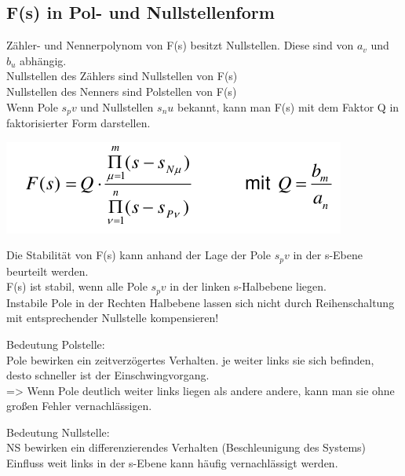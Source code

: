 \documentclass[10pt,a4paper]{article}
\begin{document}
\subsection{F(s) in Pol- und Nullstellenform}
\begin{mdframed}[style=exercise]
        Zähler- und Nennerpolynom von F(s) besitzt Nullstellen. Diese sind von $a_v$ und $b_u$ abhängig.\\
        Nullstellen des Zählers sind Nullstellen von F(s)\\
        Nullstellen des Nenners sind Polstellen von F(s)\\
        Wenn Pole $s_pv$ und Nullstellen $s_nu$ bekannt, kann man F(s) mit dem Faktor Q in faktorisierter Form darstellen.
    \end{mdframed}
    \begin{center}
            \includegraphics[width=.35\textwidth]{Figures/PolNullstellenQ.png}
        \end{center}
        \begin{mdframed}[style=exercise]
        Die Stabilität von F(s) kann anhand der Lage der Pole $s_pv$ in der s-Ebene beurteilt werden.\\
        F(s) ist stabil, wenn alle Pole $s_pv$ in der linken s-Halbebene liegen.\\
        Instabile Pole in der Rechten Halbebene lassen sich nicht durch Reihenschaltung
         mit entsprechender Nullstelle kompensieren!
    \end{mdframed}
    \begin{mdframed}[style=exercise]
        Bedeutung Polstelle:\\
        Pole bewirken ein zeitverzögertes Verhalten. je weiter links sie sich befinden,
        desto schneller ist der Einschwingvorgang.\\
        => Wenn Pole deutlich weiter links liegen als andere andere, kann man sie ohne
        großen Fehler vernachlässigen.\\
    \end{mdframed}
    \begin{mdframed}[style=exercise]
        Bedeutung Nullstelle:\\
        NS bewirken ein differenzierendes Verhalten (Beschleunigung des Systems)
        Einfluss weit links in der s-Ebene kann häufig vernachlässigt werden.

    \end{mdframed}
\end{document}
